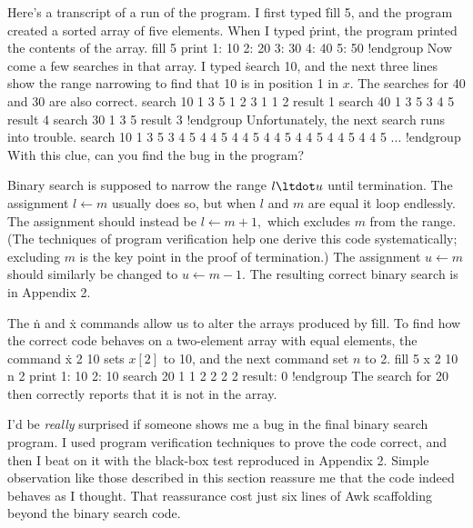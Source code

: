 Here's a transcript of a run of the program. I first typed \.{fill 5}, and the
program created a sorted array of five elements. When I typed \.{print}, the
program printed the contents of the array.
\begindisplay
\vbox{\begingroup
\verbatim
fill 5
print
1:      10
2:      20
3:      30
4:      40
5:      50
!endgroup
\endgroup}
\enddisplay
 Now come a few searches in that array. I typed \.{search 10}, and
the next three lines show the range narrowing to find that 10 is in position 1
in $x.$ The searches for 40 and 30 are also correct.
\begindisplay
\vbox{\begingroup
\verbatim
search  10
    1 3 5
    1 2 3
    1 1 2
result   1
search  40
    1 3 5
    3 4 5
result   4
search  30
    1 3 5
result   3
!endgroup
\endgroup}
\enddisplay
Unfortunately, the next search runs into trouble.
\begindisplay
\vbox{\begingroup
\verbatim
search  10
    1 3 5
    3 4 5
    4 4 5
    4 4 5
    4 4 5
    4 4 5
    4 4 5
    4 4 5
     ...
!endgroup
\endgroup}
\enddisplay
With this clue, can you find  the bug in the program?

Binary search is supposed to narrow the range $l\ltdot u$ until termination. The
assignment $l\leftarrow m$ usually does so, but when $l$ and $m$ are equal it
loop endlessly. The assignment should instead be $l\leftarrow m+1,$ which
excludes $m$ from the range. (The techniques of program verification help one
derive this code systematically; excluding $m$ is the key point in the proof of
termination.) The assignment $u\leftarrow m$ should similarly be changed to
$u\leftarrow m-1.$ The resulting correct binary search is in Appendix 2.

The \.{n} and \.{x} commands allow us to alter the arrays produced by
\.{fill}. To find how the correct code behaves on a two-element array with
equal elements, the command \.{x 2 10} sets $x[2]$ to 10, and the next
command set $n$ to 2.
\begindisplay
\vbox{\begingroup
\verbatim
fill 5
x 2 10
n 2
print
1:      10
2:      10
search 20
   1 1 2
   2 2 2
result: 0
!endgroup
\endgroup}
\enddisplay
The search for 20 then correctly reports that it is not in the array.

I'd be {\it really\/} surprised if someone shows me a bug in the final binary
search program. I used program verification techniques to prove the code
correct, and then I beat on it with the black-box test reproduced in Appendix 2.
Simple observation like those described in this section reassure me that the
code indeed behaves as I thought. That reassurance cost just six lines of Awk
scaffolding beyond the binary search code.

